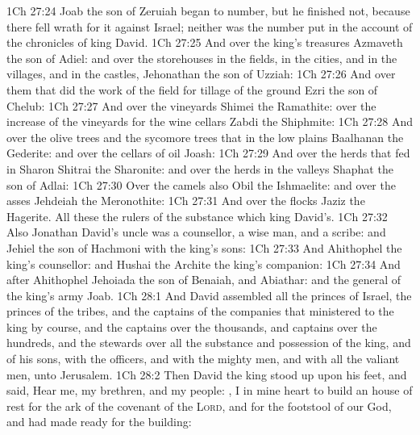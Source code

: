 \vs 1Ch 27:24 Joab the son of Zeruiah began to number, but he finished not, because there fell wrath for it against Israel; neither was the number put in the account of the chronicles of king David.
\vs 1Ch 27:25 And over the king's treasures  Azmaveth the son of Adiel: and over the storehouses in the fields, in the cities, and in the villages, and in the castles,  Jehonathan the son of Uzziah:
\vs 1Ch 27:26 And over them that did the work of the field for tillage of the ground  Ezri the son of Chelub:
\vs 1Ch 27:27 And over the vineyards  Shimei the Ramathite: over the increase of the vineyards for the wine cellars  Zabdi the Shiphmite:
\vs 1Ch 27:28 And over the olive trees and the sycomore trees that  in the low plains  Baalhanan the Gederite: and over the cellars of oil  Joash:
\vs 1Ch 27:29 And over the herds that fed in Sharon  Shitrai the Sharonite: and over the herds  in the valleys  Shaphat the son of Adlai:
\vs 1Ch 27:30 Over the camels also  Obil the Ishmaelite: and over the asses  Jehdeiah the Meronothite:
\vs 1Ch 27:31 And over the flocks  Jaziz the Hagerite. All these  the rulers of the substance which  king David's.
\vs 1Ch 27:32 Also Jonathan David's uncle was a counsellor, a wise man, and a scribe: and Jehiel the son of Hachmoni  with the king's sons:
\vs 1Ch 27:33 And Ahithophel  the king's counsellor: and Hushai the Archite  the king's companion:
\vs 1Ch 27:34 And after Ahithophel  Jehoiada the son of Benaiah, and Abiathar: and the general of the king's army  Joab.
\vs 1Ch 28:1 And David assembled all the princes of Israel, the princes of the tribes, and the captains of the companies that ministered to the king by course, and the captains over the thousands, and captains over the hundreds, and the stewards over all the substance and possession of the king, and of his sons, with the officers, and with the mighty men, and with all the valiant men, unto Jerusalem.
\vs 1Ch 28:2 Then David the king stood up upon his feet, and said, Hear me, my brethren, and my people: , I  in mine heart to build an house of rest for the ark of the covenant of the \textsc{Lord}, and for the footstool of our God, and had made ready for the building:
